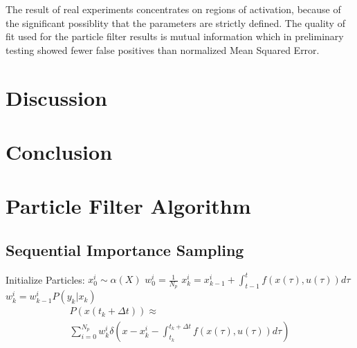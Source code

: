 \documentclass[journal]{./IEEEtran}
\begin{document}
The result of real experiments concentrates on regions of activation, because
of the significant possiblity that the parameters are strictly defined. The
quality of fit used for the particle filter results is mutual information which
in preliminary testing showed fewer false positives than normalized Mean Squared
Error. 

\section{Discussion}
\label{sec:Discussion}

\section{Conclusion}
\label{sec:Conclusion}


\appendices

\section{Particle Filter Algorithm}
\label{sec:algorithms}

\subsection{Sequential Importance Sampling}
\label{alg:BasicParticleFilter}
\begin{algorithm}
\begin{algorithmic}
\STATE Initialize Particles:
    \STATE $x^i_0  \sim \alpha(X)$
    \STATE $w^i_0 = \frac{1}{N_p}$
\ENDFOR
{}
        \STATE $x^i_k = x^i_{k-1} + \int_{t-1}^t f(x(\tau), u(\tau)) d\tau $
        \STATE $w^i_k = w^i_{k-1}P(y_k | x_k)$
    \ENDFOR
\ENDFOR
\begin{equation*}
\begin{array}{l}
P(x(t_k+\Delta t)) \approx \\
\sum_{i=0}^{N_p} w^i_k \delta\left(x - x^i_k - \int_{t_k}^{t_k+\Delta t} f(x(\tau), u(\tau)) d\tau \right) 
\end{array}
\end{equation*}
\end{algorithmic}
\end{algorithm}
\end{document}
